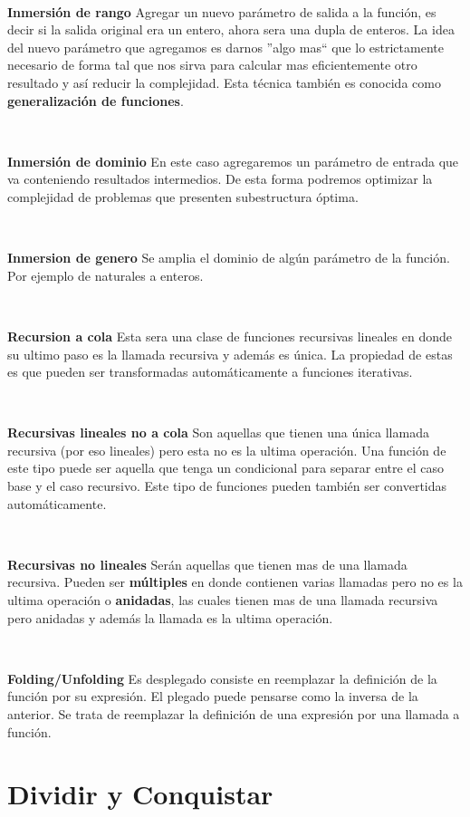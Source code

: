 \documentclass[10pt, a4paper]{report}
\begin{document}
~

\textbf{Inmersi\'on de rango} Agregar un nuevo par\'ametro de salida a la funci\'on, es decir si la salida original era un entero, ahora sera una dupla de enteros. La idea del nuevo par\'ametro que agregamos es darnos ''algo mas`` que lo estrictamente necesario de forma tal que nos sirva para calcular mas eficientemente otro resultado y as\'i reducir la complejidad. Esta t\'ecnica tambi\'en es conocida como \textbf{generalizaci\'on de funciones}.

~

\textbf{Inmersi\'on de dominio} En este caso agregaremos un par\'ametro de entrada que va conteniendo resultados intermedios. De esta forma podremos optimizar la complejidad de problemas que presenten subestructura \'optima.

~

\textbf{Inmersion de genero} Se amplia el dominio de alg\'un par\'ametro de la funci\'on. Por ejemplo de naturales a enteros.

~

\textbf{Recursion a cola} Esta sera una clase de funciones recursivas lineales en donde su ultimo paso es la llamada recursiva y adem\'as es \'unica. La propiedad de estas es que pueden ser transformadas autom\'aticamente a funciones iterativas.

~

\textbf{Recursivas lineales no a cola} Son aquellas que tienen una \'unica llamada recursiva (por eso lineales) pero esta no es la ultima operaci\'on. Una funci\'on de este tipo puede ser aquella que tenga un condicional para separar entre el caso base y el caso recursivo. Este tipo de funciones pueden tambi\'en ser convertidas autom\'aticamente.

~

\textbf{Recursivas no lineales} Ser\'an aquellas que tienen mas de una llamada recursiva. Pueden ser \textbf{m\'ultiples} en donde contienen varias llamadas pero no es la ultima operaci\'on o \textbf{anidadas}, las cuales tienen mas de una llamada recursiva pero anidadas y adem\'as la llamada es la ultima operaci\'on.

~

\textbf{Folding/Unfolding} Es desplegado consiste en reemplazar la definici\'on de la funci\'on por su expresi\'on. El plegado puede pensarse como la inversa de la anterior. Se trata de reemplazar la definici\'on de una expresi\'on por una llamada a funci\'on.

\newpage
\section{Dividir y Conquistar}
\end{document}
